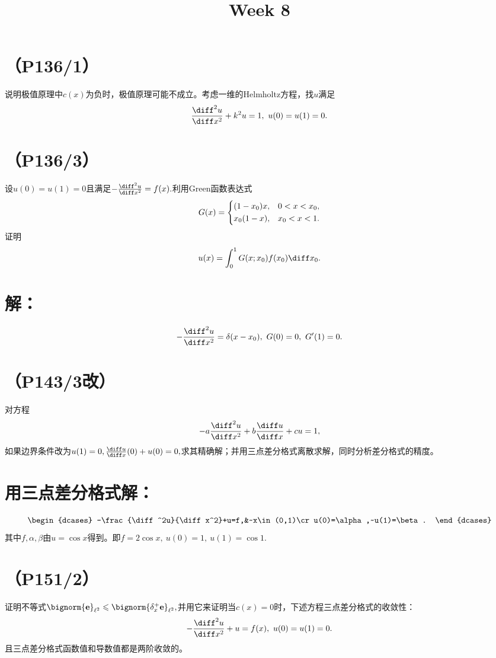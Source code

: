 \documentclass{homework}
\title{Week 8}
\date{}
\begin{document}
\maketitle
\section{（P136/1）}
说明极值原理中$c(x)$为负时，极值原理可能不成立。考虑一维的Helmholtz方程，找$u$满足$$\frac{\diff ^2u}{\diff x^2}+k^2u=1,~u(0)=u(1)=0.$$
\section{（P136/3）}
设$u(0)=u(1)=0$且满足$-\frac{\diff ^2u}{\diff x^2}=f(x).$利用Green函数表达式
\begin{eqnarray*}
G(x)=
\begin{dcases}
(1-x_0)x, &0<x<x_0,\cr x_0(1-x), &x_0<x<1.
\end{dcases}
\end{eqnarray*}
证明$$u(x)=\int_0^1G(x;x_0)f(x_0)\diff x_0.$$
\section{解：}
$$-\frac{\diff ^2u}{\diff x^2}=\delta(x-x_0),~G(0)=0,~G'(1)=0.$$
\section{（P143/3改）}
对方程$$-a\frac{\diff ^2u}{\diff x^2}+b\frac{\diff u}{\diff x}+cu=1,$$如果边界条件改为$u(1)=0,\frac{\diff u}{\diff x}(0)+u(0)=0,$求其精确解；并用三点差分格式离散求解，同时分析差分格式的精度。
\section{用三点差分格式解：}
\begin{eqnarray*}
\begin{dcases}
-\frac{\diff^2u}{\diff x^2}+u=f,&~x\in(0,1)\cr u(0)=\alpha,~u(1)=\beta.
\end{dcases}
\end{eqnarray*}
其中$f,\alpha,\beta$由$u=\cos x$得到。即$f=2\cos x,~u(0)=1,~u(1)=\cos 1.$
\section{（P151/2）}
证明不等式$\bignorm{\bf e}_{\ell^2}\leqslant\bignorm{\delta^+_x{\bf e}}_{\ell^2},$并用它来证明当$c(x)=0$时，下述方程三点差分格式的收敛性：$$-\frac{\diff^2u}{\diff x^2}+u=f(x),~u(0)=u(1)=0.$$且三点差分格式函数值和导数值都是两阶收敛的。
\end{document}
